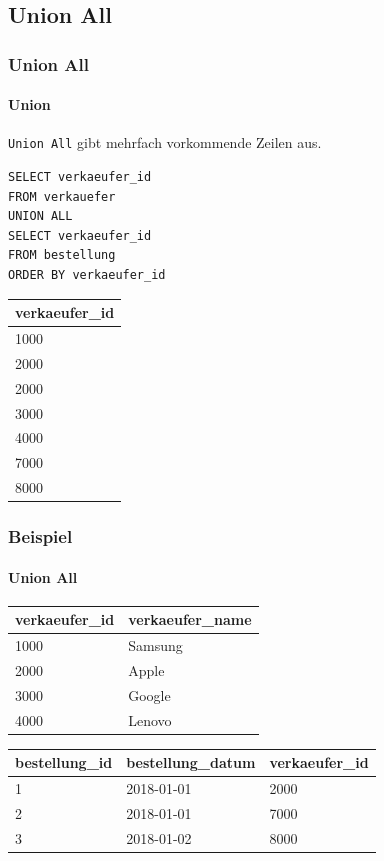 \documentclass[10pt,a4paper]{beamer}
\begin{document}
\subsection{Union All}
\begin{frame}[fragile]
\frametitle{Union All}
\framesubtitle{Union}
\lstinline|Union All| gibt mehrfach vorkommende Zeilen aus.  \\
\begin{lstlisting}
SELECT verkaeufer_id 
FROM verkauefer
UNION ALL
SELECT verkaeufer_id 
FROM bestellung
ORDER BY verkaeufer_id 
\end{lstlisting}
\pause
\begin{tabular}{l}
\textbf{verkaeufer\_id} \\ \hline
1000 \\
2000 \\
2000 \\
3000 \\
4000 \\
7000 \\ 
8000
\end{tabular}
\end{frame}

\begin{frame}[fragile]
\frametitle{Beispiel}
\framesubtitle{Union All}
\begin{tabular}{l|l}
\textbf{verkaeufer\_id} & \textbf{verkaeufer\_name} \\ \hline
1000           & Samsung          \\
2000           & Apple            \\
3000           & Google           \\
4000           & Lenovo           \\
\end{tabular} 
\newline
\vspace*{1 cm}
\newline
\begin{tabular}{l|l|l}
\textbf{bestellung\_id} & \textbf{bestellung\_datum} & \textbf{verkaeufer\_id} \\ \hline
1              & 2018-01-01        & 2000           \\
2              & 2018-01-01        & 7000           \\
3              & 2018-01-02        & 8000           \\
\end{tabular}
\end{frame}
\end{document}
